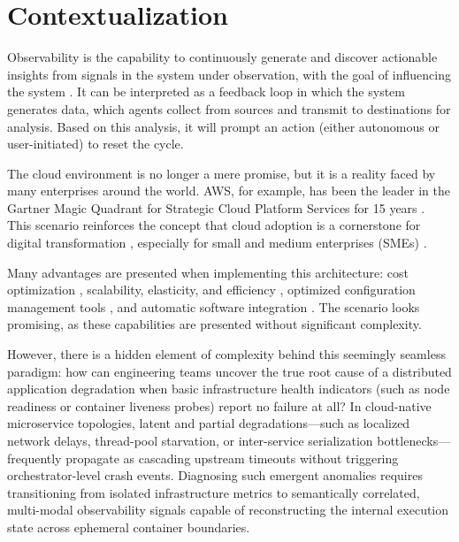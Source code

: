\section{Contextualization}
\label{sec:context}

Observability is the capability to continuously generate and discover actionable insights from signals in the system under observation, with the goal of influencing the system \cite{hausenblas_2023}. It can be interpreted as a feedback loop in which the system generates data, which agents collect from sources and transmit to destinations for analysis. Based on this analysis, it will prompt an action (either autonomous or user-initiated) to reset the cycle.

The cloud environment is no longer a mere promise, but it is a reality faced by many enterprises around the world. AWS, for example, has been the leader in the Gartner Magic Quadrant for Strategic Cloud Platform Services for 15 years \cite{aws_cloud_computing_2025}. This scenario reinforces the concept that cloud adoption is a cornerstone for digital transformation \cite{kao_2024}, especially for small and medium enterprises (SMEs) \cite{ahmad_2025}.

Many advantages are presented when implementing this architecture: cost optimization \cite{plotnikovs_kodors_2017}, scalability, elasticity, and efficiency \cite{lehrig_2015}, optimized configuration management tools \cite{hintsch_2016}, and automatic software integration \cite{apostu_2013}. The scenario looks promising, as these capabilities are presented without significant complexity.

However, there is a hidden element of complexity behind this seemingly seamless paradigm: how can engineering teams uncover the true root cause of a distributed application degradation when basic infrastructure health indicators (such as node readiness or container liveness probes) report no failure at all? In cloud-native microservice topologies, latent and partial degradations---such as localized network delays, thread-pool starvation, or inter-service serialization bottlenecks---frequently propagate as cascading upstream timeouts without triggering orchestrator-level crash events. Diagnosing such emergent anomalies requires transitioning from isolated infrastructure metrics to semantically correlated, multi-modal observability signals capable of reconstructing the internal execution state across ephemeral container boundaries.
 